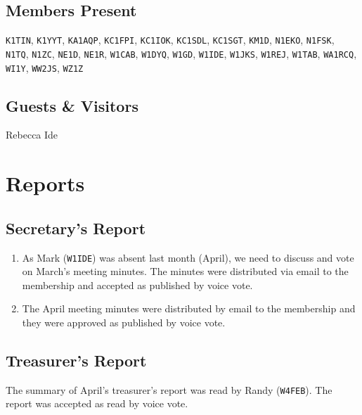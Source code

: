 \documentclass[10pt,letterpaper]{article}
\begin{document}
\subsection{Members Present}
\texttt{K1TIN},
\texttt{K1YYT},
\texttt{KA1AQP},
\texttt{KC1FPI},
\texttt{KC1IOK},
\texttt{KC1SDL},
\texttt{KC1SGT},
\texttt{KM1D},
\texttt{N1EKO},
\texttt{N1FSK},
\texttt{N1TQ},
\texttt{N1ZC},
\texttt{NE1D},
\texttt{NE1R},
\texttt{W1CAB},
\texttt{W1DYQ},
\texttt{W1GD},
\texttt{W1IDE},
\texttt{W1JKS},
\texttt{W1REJ},
\texttt{W1TAB},
\texttt{WA1RCQ},
\texttt{WI1Y},
\texttt{WW2JS},
\texttt{WZ1Z}

\subsection{Guests \& Visitors}
Rebecca Ide


\section{Reports}

\subsection{Secretary's Report}
\begin{enumerate}
  \item As Mark (\texttt{W1IDE}) was absent last month (April), we need to discuss and vote on March's meeting minutes. The minutes were distributed via email to the membership and accepted as published by voice vote.
  \item The April meeting minutes were distributed by email to the membership and they were approved as published by voice vote.
\end{enumerate}

\newpage
\subsection{Treasurer's Report}
The summary of April's treasurer's report was read by Randy (\texttt{W4FEB}). The report was accepted as read by voice vote.
\end{document}
